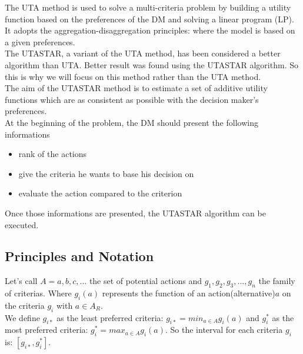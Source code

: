 \documentclass{report}
\begin{document}
The UTA method is used to solve a multi-criteria problem by building a utility function based on the preferences of the DM and solving a linear program (LP). It adopts the aggregation-disaggregation principles: where the model is based on a given preferences.\\ The UTASTAR, a variant of the UTA method, has been considered a better algorithm than UTA. Better result was found using the UTASTAR algorithm. So this is why we will focus on this method rather than the UTA method.\\The aim of the UTASTAR method is to estimate a set of additive utility functions which are as consistent as possible with the decision maker's preferences.\\
At the beginning of the problem, the DM should present the following informations 
\begin{itemize}
\item rank of the actions
\item give the criteria he wants to base his decision on 
\item evaluate the action compared to the criterion
\end{itemize}
Once those informations are presented, the UTASTAR algorithm can be executed. 

\newpage
\subsection{Principles and Notation}
Let's call $A={a,b,c,...}$ the set of potential actions and $g_1, g_2, g_3, ..., g_n$ the family of criterias. Where $g_i(a)$ represents the function of an action(alternative)$a$ on the criteria $g_i$ with $a \in A_R$. \\

We define $g_{i*}$ as the least preferred criteria: $g_{i*} = min_{a \in A} g_i (a)$ and $g_i^{*}$ as the most preferred criteria: $g_i^{*} = max_{a \in A} g_i (a)$. So the interval for each criteria $g_i$ is: $[g_{i*} , g_i^{*}]$.\\
\end{document}
